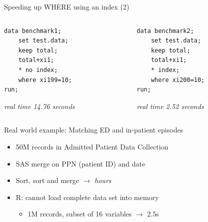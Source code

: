 \documentclass[aspectratio=169,12pt,usepdftitle=false]{beamer} %
\begin{document}
\begin{frame}[fragile]{Speeding up WHERE using an index (2)}
\begin{columns}
\begin{column}{0.5\textwidth}
\begin{verbatim}
data benchmark1;
    set test.data;
    keep total;
    total+xi1;
    * no index;
    where xi199=10;
run;
\end{verbatim}
\emph{real time 14.76 seconds}
\end{column}
\begin{column}{0.5\textwidth}
\begin{verbatim}
data benchmark2;
    set test.data;
    keep total;
    total+xi1;
    * index;
    where xi200=10;
run;
\end{verbatim}
\emph{real time 2.52 seconds}
\end{column}
\end{columns}
\end{frame}
{
\begin{frame}[plain]
\end{frame}
}

\begin{frame}{Real world example: Matching ED and in-patient episodes}
    \begin{itemize}
	\item 50M records in Admitted Patient Data Collection
	\item SAS merge on PPN (patient ID) and date
	\item Sort, sort and merge $\rightarrow$ \emph{hours}
	\item R: cannot load complete data set into memory
	    \begin{itemize}
		\item 1M records, subset of 16 variables $\rightarrow$ 2.5s
	    \end{itemize}
    \end{itemize}
\end{frame}
\end{document}
